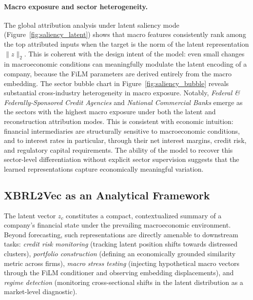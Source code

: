 \documentclass[a4paper,fleqn]{cas-dc}
\begin{document}
\paragraph{Macro exposure and sector heterogeneity.}
The global attribution analysis under latent saliency mode (Figure~\ref{fig:saliency_latent}) shows that macro features consistently rank among the top attributed inputs when the target is the norm of the latent representation $\|z\|_2$.  This is coherent with the design intent of the model: even small changes in macroeconomic conditions can meaningfully modulate the latent encoding of a company, because the FiLM parameters are derived entirely from the macro embedding.  The sector bubble chart in Figure~\ref{fig:saliency_bubble} reveals substantial cross-industry heterogeneity in macro exposure.  Notably, \emph{Federal \& Federally-Sponsored Credit Agencies} and \emph{National Commercial Banks} emerge as the sectors with the highest macro exposure under both the latent and reconstruction attribution modes.  This is consistent with economic intuition: financial intermediaries are structurally sensitive to macroeconomic conditions, and to interest rates in particular, through their net interest margins, credit risk, and regulatory capital requirements.  The ability of the model to recover this sector-level differentiation without explicit sector supervision suggests that the learned representations capture economically meaningful variation.

\subsection{XBRL2Vec as an Analytical Framework}

The latent vector $z_c$ constitutes a compact, contextualized summary of a company's financial state under the prevailing macroeconomic environment.  Beyond forecasting, such representations are directly amenable to downstream tasks: \emph{credit risk monitoring} (tracking latent position shifts towards distressed clusters), \emph{portfolio construction} (defining an economically grounded similarity metric across firms), \emph{macro stress testing} (injecting hypothetical macro vectors through the FiLM conditioner and observing embedding displacements), and \emph{regime detection} (monitoring cross-sectional shifts in the latent distribution as a market-level diagnostic).
\end{document}
